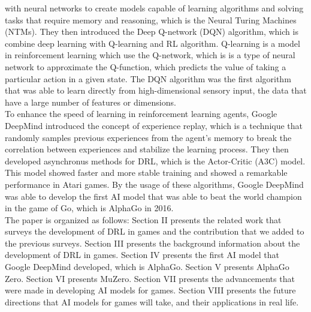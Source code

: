 with neural networks to create models capable of learning algorithms and
solving tasks that require memory and reasoning, which is the Neural Turing
Machines (NTMs)\cite{I4}. They then introduced the Deep Q-network (DQN)
algorithm, which is combine deep learning with Q-learning and RL algorithm.
Q-learning is a model in reinforcement learning which use the Q-network, which
is is a type of neural network to approximate the Q-function, which predicts
the value of taking a particular action in a given state\cite{I5}. The DQN
algorithm was the first algorithm that was able to learn directly from
high-dimensional sensory input, the data that have a large number of features
or dimensions\cite{I6}.\\ To enhance the speed of learning in reinforcement
learning agents, Google DeepMind introduced the concept of experience replay,
which is a technique that randomly samples previous experiences from the
agent's memory to break the correlation between experiences and stabilize the
learning process\cite{I7}. They then developed asynchronus methods for DRL,
which is the Actor-Critic (A3C) model. This model showed faster and more stable
training and showed a remarkable performance in Atari games\cite{I8}. By the
usage of these algorithms, Google DeepMind was able to develop the first AI
model that was able to beat the world champion in the game of Go, which is
AlphaGo in 2016.\\
The paper is organized as follows: Section II presents the related work that
surveys the development of DRL in games and the contribution that we 
added to the previous surveys. Section III presents the background 
information about the development of DRL in games. Section IV presents the
first AI model that Google DeepMind developed, which is AlphaGo. Section V
presents AlphaGo Zero. Section VI presents MuZero. Section VII presents the
advancements that were made in developing AI models for games. Section VIII 
presents the future directions that AI models for games will take, and their
applications in real life.
